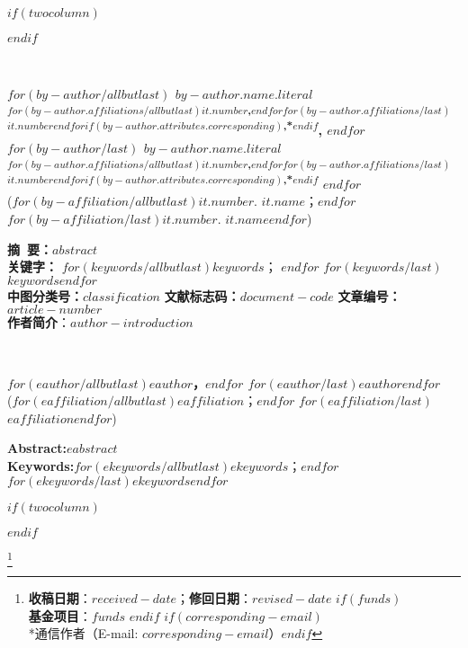 $if(twocolumn)$
\twocolumn
\begin{figure*}[t]
$endif$

\begin{center}
 \parbox{\textwidth}{
   \begin{center}
      \\
     \vspace{10pt}
   \end{center}
   \begin{center}
    \textbf{
      $for(by-author/allbutlast)$
        $by-author.name.literal$
        \textsuperscript{$for(by-author.affiliations/allbutlast)$$it.number$,$endfor$$for(by-author.affiliations/last)$$it.number$$endfor$$if(by-author.attributes.corresponding)$,*$endif$},
      $endfor$
      $for(by-author/last)$
        $by-author.name.literal$
        \textsuperscript{$for(by-author.affiliations/allbutlast)$$it.number$,$endfor$$for(by-author.affiliations/last)$$it.number$$endfor$$if(by-author.attributes.corresponding)$,*$endif$}
      $endfor$
    }\\[2pt]
    \small{
      ($for(by-affiliation/allbutlast)$$it.number$. $it.name$；$endfor$
      $for(by-affiliation/last)$$it.number$. $it.name$$endfor$)}\\[7pt]
    \end{center}
   {
    \small{
      \textbf{摘~要：}$abstract$ \\
      \textbf{关键字：} $for(keywords/allbutlast)$$keywords$； $endfor$ $for(keywords/last)$$keywords$$endfor$ \\
      \textbf{中图分类号：}$classification$ \hfill
      \textbf{文献标志码：}$document-code$ \hfill
      \textbf{文章编号：}$article-number$ \\
      \textbf{作者简介}：$author-introduction$
    }
  }
}
\end{center}

\begin{center}
 \parbox{\textwidth}{
   \begin{center}
      \vspace{20pt}
       \\
      \vspace{10pt}
   \end{center}
   \begin{center}
    \textbf{
      $for(eauthor/allbutlast)$$eauthor$，$endfor$
      $for(eauthor/last)$$eauthor$$endfor$
    }\\[2pt]
    \small{
      ($for(eaffiliation/allbutlast)$$eaffiliation$；$endfor$
      $for(eaffiliation/last)$$eaffiliation$$endfor$)}\\[7pt]
    \end{center}
   {
    \small{
      \textbf{Abstract:}\quad $eabstract$ \\
      \textbf{Keywords:}\quad $for(ekeywords/allbutlast)$$ekeywords$；$endfor$ $for(ekeywords/last)$$ekeywords$$endfor$
    }
   }
 }
\end{center}

$if(twocolumn)$
\twocolumn
\end{figure*}
$endif$

\footnote{ 
  \textbf{收稿日期}：$received-date$；\textbf{修回日期}：$revised-date$
  $if(funds)$ \\\textbf{基金项目}：$funds$ $endif$
  $if(corresponding-email)$ \\ *通信作者（E-mail: $corresponding-email$）$endif$
}

\pagestyle{fancy}
\setcounter{section}{-1}
